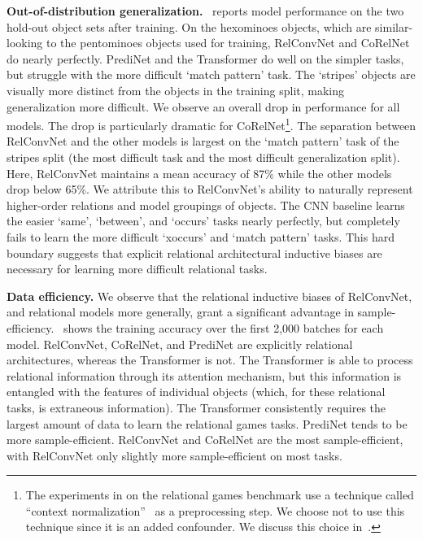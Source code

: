 \textbf{Out-of-distribution generalization.}~ reports model performance on the two hold-out object sets after training. On the hexominoes objects, which are similar-looking to the pentominoes objects used for training, RelConvNet and CoRelNet do nearly perfectly. PrediNet and the Transformer do well on the simpler tasks, but struggle with the more difficult `match pattern' task. The `stripes' objects are visually more distinct from the objects in the training split, making generalization more difficult. We observe an overall drop in performance for all models. The drop is particularly dramatic for CoRelNet\footnote{The experiments in \citet{kergNeuralArchitecture2022} on the relational games benchmark use a technique called ``context normalization''~\citep{webbLearningRepresentationsThat2020} as a preprocessing step. We choose not to use this technique since it is an added confounder. We discuss this choice in~.}.
The separation between RelConvNet and the other models is largest on the `match pattern' task of the stripes split (the most difficult task and the most difficult generalization split). Here, RelConvNet maintains a mean accuracy of 87\% while the other models drop below 65\%. We attribute this to RelConvNet's ability to naturally represent higher-order relations and model groupings of objects. The CNN baseline learns the easier `same', `between', and `occurs' tasks nearly perfectly, but completely fails to learn the more difficult `xoccurs' and `match pattern' tasks. This hard boundary suggests that explicit relational architectural inductive biases are necessary for learning more difficult relational tasks.

\textbf{Data efficiency.} We observe that the relational inductive biases of RelConvNet, and relational models more generally, grant a significant advantage in sample-efficiency.~ shows the training accuracy over the first 2,000 batches for each model. RelConvNet, CoRelNet, and PrediNet are explicitly relational architectures, whereas the Transformer is not. The Transformer is able to process relational information through its attention mechanism, but this information is entangled with the features of individual objects (which, for these relational tasks, is extraneous information). The Transformer consistently requires the largest amount of data to learn the relational games tasks. PrediNet tends to be more sample-efficient. RelConvNet and CoRelNet are the most sample-efficient, with RelConvNet only slightly more sample-efficient on most tasks.

